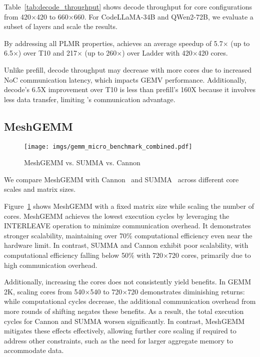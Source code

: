  Table~\ref{tab:decode_throughput} shows decode throughput for core configurations from 420$\times$420 to 660$\times$660. For CodeLLaMA-34B and QWen2-72B, we evaluate a subset of layers and scale the results.

By addressing all PLMR properties, \sys achieves an average speedup of 5.7$\times$ (up to 6.5$\times$) over T10 and 217$\times$ (up to 260$\times$) over Ladder with 420$\times$420 cores.

Unlike prefill, decode throughput may decrease with more cores due to increased NoC communication latency, which impacts GEMV performance. Additionally, decode’s 6.5X improvement over T10 is less than prefill’s 160X because it involves less data transfer, limiting \sys’s communication advantage.

\vspace{-0.2cm}
\subsection{MeshGEMM}\label{sec:eval:meshgemm}
\vspace{-0.2cm}

\begin{figure}
    \centering
    \texttt{[image: imgs/gemm\_micro\_benchmark\_combined.pdf]}
    \caption{MeshGEMM vs. SUMMA vs. Cannon}
    \vspace{-0.5cm}
    \label{fig:eval:meshgemm}
\end{figure}

We compare MeshGEMM with Cannon~\cite{cannon} and SUMMA~\cite{summa} across different core scales and matrix sizes.

Figure~\ref{fig:eval:meshgemm} shows MeshGEMM with a fixed matrix size while scaling the number of cores. MeshGEMM achieves the lowest execution cycles by leveraging the INTERLEAVE operation to minimize communication overhead. It demonstrates stronger scalability, maintaining over 70\% computational efficiency even near the hardware limit. In contrast, SUMMA and Cannon exhibit poor scalability, with computational efficiency falling below 50\% with 720$\times$720 cores, primarily due to high communication overhead.

Additionally, increasing the cores does not consistently yield benefits. In GEMM 2K, scaling cores from 540$\times$540 to 720$\times$720 demonstrates diminishing returns: while computational cycles decrease, the additional communication overhead from more rounds of shifting negates these benefits. As a result, the total execution cycles for Cannon and SUMMA worsen significantly. In contrast, MeshGEMM mitigates these effects effectively, allowing further core scaling if required to address other constraints, such as the need for larger aggregate memory to accommodate data.

